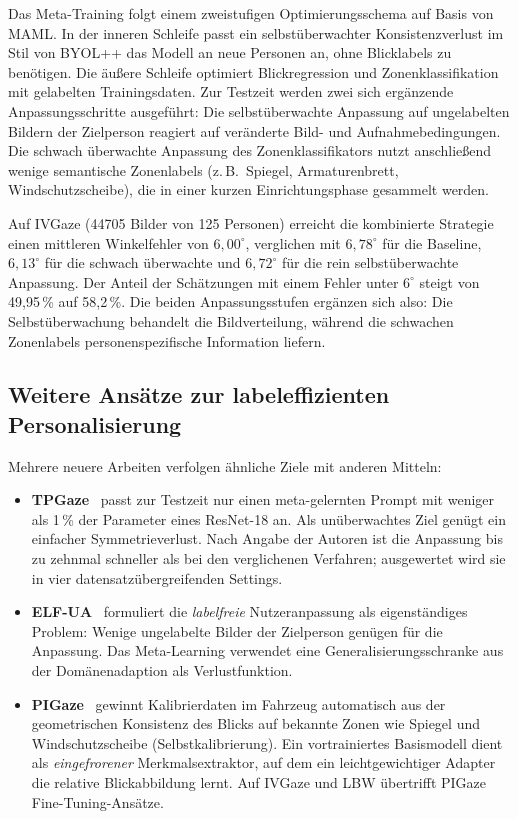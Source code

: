 \documentclass[
  11pt,
  a4paper,
  oneside,
  DIV=12,                 %
  BCOR=8mm,               %
  parskip=half,           %
  headings=normal,
  bibliography=totoc,     %
  listof=totoc            %
]{scrreprt}
\begin{document}
Das Meta-Training folgt einem zweistufigen Optimierungsschema auf Basis von MAML. In der inneren Schleife passt ein selbstüberwachter Konsistenzverlust im Stil von BYOL++ das Modell an neue Personen an, ohne Blicklabels zu benötigen. Die äußere Schleife optimiert Blickregression und Zonenklassifikation mit gelabelten Trainingsdaten. Zur Testzeit werden zwei sich ergänzende Anpassungsschritte ausgeführt: Die selbstüberwachte Anpassung auf ungelabelten Bildern der Zielperson reagiert auf veränderte Bild- und Aufnahmebedingungen. Die schwach überwachte Anpassung des Zonenklassifikators nutzt anschließend wenige semantische Zonenlabels (z.\,B.\ Spiegel, Armaturenbrett, Windschutzscheibe), die in einer kurzen Einrichtungsphase gesammelt werden.

Auf IVGaze (\num{44705} Bilder von 125 Personen) erreicht die kombinierte Strategie einen mittleren Winkelfehler von $6,00^\circ$, verglichen mit $6,78^\circ$ für die Baseline, $6,13^\circ$ für die schwach überwachte und $6,72^\circ$ für die rein selbstüberwachte Anpassung. Der Anteil der Schätzungen mit einem Fehler unter $6^\circ$ steigt von 49,95\,\% auf 58,2\,\%. Die beiden Anpassungsstufen ergänzen sich also: Die Selbstüberwachung behandelt die Bildverteilung, während die schwachen Zonenlabels personenspezifische Information liefern.

\subsection{Weitere Ansätze zur labeleffizienten Personalisierung}
\label{subsec:tta_weitere}
Mehrere neuere Arbeiten verfolgen ähnliche Ziele mit anderen Mitteln:
\begin{itemize}
  \item \textbf{TPGaze}~\cite{liu2024tpgaze} passt zur Testzeit nur einen meta-gelernten Prompt mit weniger als 1\,\% der Parameter eines ResNet-18 an. Als unüberwachtes Ziel genügt ein einfacher Symmetrieverlust. Nach Angabe der Autoren ist die Anpassung bis zu zehnmal schneller als bei den verglichenen Verfahren; ausgewertet wird sie in vier datensatzübergreifenden Settings.
  \item \textbf{ELF-UA}~\cite{wu2024elfua} formuliert die \emph{labelfreie} Nutzeranpassung als eigenständiges Problem: Wenige ungelabelte Bilder der Zielperson genügen für die Anpassung. Das Meta-Learning verwendet eine Generalisierungsschranke aus der Domänenadaption als Verlustfunktion.
  \item \textbf{PIGaze}~\cite{wang2026pigaze} gewinnt Kalibrierdaten im Fahrzeug automatisch aus der geometrischen Konsistenz des Blicks auf bekannte Zonen wie Spiegel und Windschutzscheibe (Selbstkalibrierung). Ein vortrainiertes Basismodell dient als \emph{eingefrorener} Merkmalsextraktor, auf dem ein leichtgewichtiger Adapter die relative Blickabbildung lernt. Auf IVGaze und LBW übertrifft PIGaze Fine-Tuning-Ansätze.
\end{itemize}
\end{document}

